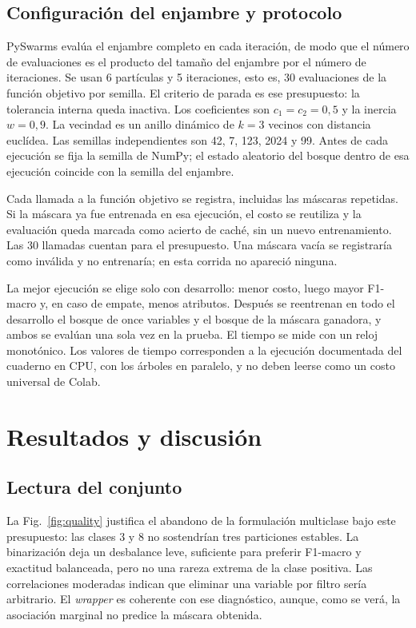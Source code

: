 \documentclass[conference]{IEEEtran}
\begin{document}
\subsection{Configuración del enjambre y protocolo}
PySwarms evalúa el enjambre completo en cada iteración, de modo que el número de evaluaciones es el producto del tamaño del enjambre por el número de iteraciones. Se usan 6 partículas y 5 iteraciones, esto es, 30 evaluaciones de la función objetivo por semilla. El criterio de parada es ese presupuesto: la tolerancia interna queda inactiva. Los coeficientes son $c_1=c_2=0{,}5$ y la inercia $w=0{,}9$. La vecindad es un anillo dinámico de $k=3$ vecinos con distancia euclídea. Las semillas independientes son 42, 7, 123, 2024 y 99. Antes de cada ejecución se fija la semilla de NumPy; el estado aleatorio del bosque dentro de esa ejecución coincide con la semilla del enjambre.

Cada llamada a la función objetivo se registra, incluidas las máscaras repetidas. Si la máscara ya fue entrenada en esa ejecución, el costo se reutiliza y la evaluación queda marcada como acierto de caché, sin un nuevo entrenamiento. Las 30 llamadas cuentan para el presupuesto. Una máscara vacía se registraría como inválida y no entrenaría; en esta corrida no apareció ninguna.

La mejor ejecución se elige solo con desarrollo: menor costo, luego mayor F1-macro y, en caso de empate, menos atributos. Después se reentrenan en todo el desarrollo el bosque de once variables y el bosque de la máscara ganadora, y ambos se evalúan una sola vez en la prueba. El tiempo se mide con un reloj monotónico. Los valores de tiempo corresponden a la ejecución documentada del cuaderno en CPU, con los árboles en paralelo, y no deben leerse como un costo universal de Colab.

\section{Resultados y discusión}

\subsection{Lectura del conjunto}
La Fig.~\ref{fig:quality} justifica el abandono de la formulación multiclase bajo este presupuesto: las clases 3 y 8 no sostendrían tres particiones estables. La binarización deja un desbalance leve, suficiente para preferir F1-macro y exactitud balanceada, pero no una rareza extrema de la clase positiva. Las correlaciones moderadas indican que eliminar una variable por filtro sería arbitrario. El \emph{wrapper} es coherente con ese diagnóstico, aunque, como se verá, la asociación marginal no predice la máscara obtenida.
\end{document}
